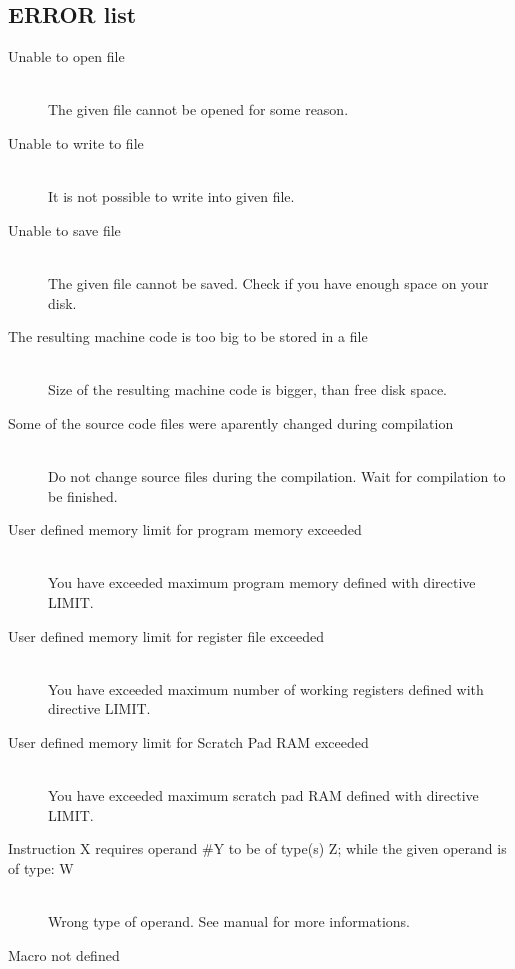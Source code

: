 {                \subsection{ERROR list}
                    \begin{description}
                    \item[Unable to open file] \hfill \\
                    The given file cannot be opened for some reason.
                    \item[Unable to write to file] \hfill \\
                    It is not possible to write into given file.
                    \item[Unable to save file] \hfill \\
                    The given file cannot be saved. Check if you have enough space on your disk.
                    \item[The resulting machine code is too big to be stored in a file]\hfill \\
                    Size of the resulting machine code is bigger, than free disk space.
                    \item[Some of the source code files were aparently changed during compilation]\hfill \\
                    Do not change source files during the compilation. Wait for compilation to be finished.
                    \item[User defined memory limit for program memory exceeded]\hfill \\
                    You have exceeded maximum program memory defined with directive LIMIT.
                    \item[User defined memory limit for register file exceeded]\hfill \\
                    You have exceeded maximum number of working registers defined with directive LIMIT.
                    \item[User defined memory limit for Scratch Pad RAM exceeded]\hfill \\
                    You have exceeded maximum scratch pad RAM defined with directive LIMIT.
                    \item[Instruction X requires operand \#Y to be of type(s) Z; while the given operand is of type: W] \hfill \\   %
                    Wrong type of operand. See manual for more informations.
                    \item[Macro not defined ] \hfill \\

\end{description}}
